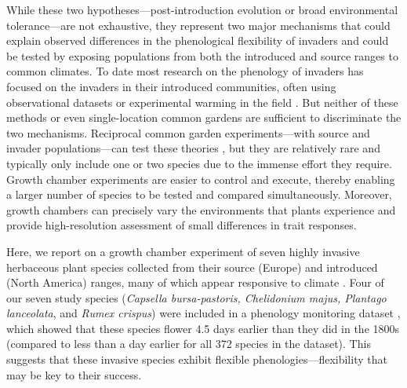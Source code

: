 \documentclass[11pt]{article}\usepackage[]{graphicx}\usepackage[]{color}
\begin{document}
While these two hypotheses---post-introduction evolution or broad environmental tolerance---are not exhaustive, they represent two major mechanisms that could explain observed differences in the phenological flexibility of invaders \parencite{Wolkovich2014,Reeb2020,Zettlemoyer2019} and could be tested by exposing populations from both the introduced and source ranges to common climates. To date most research on the phenology of invaders has focused on the invaders in their introduced communities, often using observational datasets \parencite[e.g.,][]{Wolkovich2013} or experimental warming in the field \parencite[e.g.,][]{Zettlemoyer2019}. But neither of these methods or even single-location common gardens \parencite[i.e., testing individuals from only one part of the range or in only one site,][]{Conner2004,Vitasse2009} are sufficient to discriminate the two mechanisms. Reciprocal common garden experiments---with source and invader populations---can test these theories \parencite[e.g.,][]{Williams2008,Lamarque2015}, but they are relatively rare and typically only include one or two species due to the immense effort they require. Growth chamber experiments are easier to control and execute, thereby enabling a larger number of species to be tested and compared simultaneously. Moreover, growth chambers can precisely vary the environments that plants experience and provide high-resolution assessment of small differences in trait responses. 

Here, we report on a growth chamber experiment of seven highly invasive herbaceous plant species collected from their source (Europe) and introduced (North America) ranges, many of which appear responsive to climate \parencite{Wolkovich2014}. Four of our seven study species (\textit{Capsella bursa-pastoris, Chelidonium majus, Plantago lanceolata}, and \textit{Rumex crispus}) were included in a phenology monitoring dataset \parencite[the Concord Phenology Dataset,][]{Willis:2008bf}, which showed that these species flower 4.5 days earlier than they did in the 1800s (compared to less than a day earlier for all 372 species in the dataset). This suggests that these invasive species exhibit flexible phenologies---flexibility that may be key to their success. 
\end{document}
